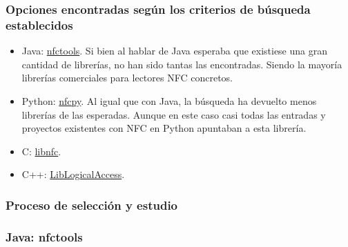 \subsubsection{Opciones encontradas según los criterios de búsqueda establecidos}

\begin{itemize}
    \item Java: \href{https://github.com/grundid/nfctools}{nfctools}. Si bien al
    hablar de Java esperaba que existiese una gran cantidad de librerías, no han
    sido tantas las encontradas. Siendo la mayoría librerías comerciales para
    lectores NFC concretos.
    \item Python: \href{https://github.com/nfcpy/nfcpy}{nfcpy}. Al igual que con
    Java, la búsqueda ha devuelto menos librerías de las esperadas. Aunque en
    este caso casi todas las entradas y proyectos existentes con NFC en Python
    apuntaban a esta librería.
    \item C: \href{https://github.com/nfc-tools/libnfc}{libnfc}. 
    \item C++: \href{https://github.com/liblogicalaccess/liblogicalaccess}{LibLogicalAccess}.
\end{itemize}

\subsubsection{Proceso de selección y estudio}

\subsubsection{Java: nfctools}


